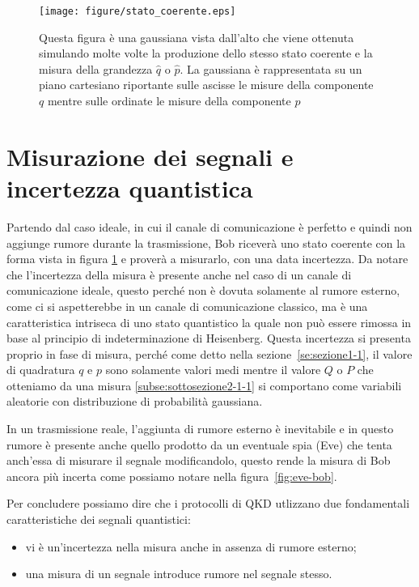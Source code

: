 \begin{figure}[h] 
\begin{center}
\texttt{[image: figure/stato\_coerente.eps]}
\end{center}
\caption[stato-coerente]{Questa figura \`e una gaussiana vista dall'alto che viene ottenuta simulando molte volte la produzione dello stesso stato coerente e la misura della grandezza $\hat q$ o $\hat p$. La gaussiana \`e rappresentata su un piano cartesiano riportante sulle ascisse le misure della componente $q$ mentre sulle ordinate le misure della componente $p$} \label{fig:stato-coerente}
\end{figure}

\section{Misurazione dei segnali e incertezza quantistica}
Partendo dal caso ideale, in cui il canale di comunicazione \`e perfetto e quindi non aggiunge rumore durante la trasmissione, Bob ricever\`a uno stato coerente con la forma vista in figura \ref{fig:stato-coerente} e proverà a misurarlo, con una data incertezza. Da notare che l'incertezza della misura \`e presente anche nel caso di un canale di comunicazione ideale, questo perch\'e non \`e dovuta solamente al rumore esterno, come ci si aspetterebbe in un canale di comunicazione classico, ma \`e una caratteristica intriseca di uno stato quantistico la quale non pu\`o essere rimossa in base al principio di indeterminazione di Heisenberg. Questa incertezza si presenta proprio in fase di misura, perch\'e come detto nella sezione~\ref{se:sezione1-1}, il valore di quadratura $q$ e $p$ sono solamente valori medi mentre il valore $Q$ o $P$ che otteniamo da una misura \ref{subse:sottosezione2-1-1} si comportano come variabili aleatorie con distribuzione di probabilit\`a gaussiana. 

In un trasmissione reale, l'aggiunta di rumore esterno \`e inevitabile e in questo rumore \`e presente anche quello prodotto da un eventuale spia (Eve) che tenta anch'essa di misurare il segnale modificandolo, questo rende la misura di Bob ancora pi\`u incerta come possiamo notare nella figura~\ref{fig:eve-bob}. 

Per concludere possiamo dire che i protocolli di QKD utlizzano due fondamentali caratteristiche dei segnali quantistici:
\begin{itemize}
\item vi è un'incertezza nella misura anche in assenza di rumore esterno;
\item una misura di un segnale introduce rumore nel segnale stesso.
\end{itemize}

